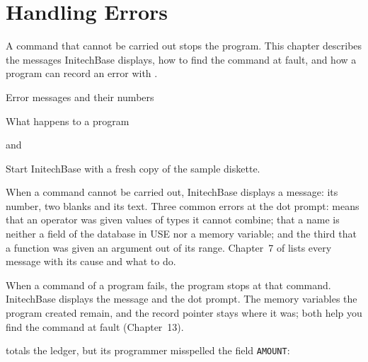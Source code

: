 \chapter{Handling Errors}
A command that cannot be carried out stops the program.  This chapter
describes the messages InitechBase displays, how to find the command at fault,
and how a program can record an error with .

\begin{ChapterCovers}
\item Error messages and their numbers
\item What happens to a program
\item {} and 
\end{ChapterCovers}

Start InitechBase with a fresh copy of the sample diskette.

When a command cannot be carried out, InitechBase displays a message: its
number, two blanks and its text.  Three common errors at the dot prompt:
 means that an operator was given values of types
it cannot combine;  that a name is neither a field
of the database in USE nor a memory variable; and the third that a function was
given an argument out of its range.  Chapter~7 of 
lists every message with its cause and what to do.

When a command of a program fails, the program stops at that command.
InitechBase displays the message and the dot prompt.  The memory variables the
program created remain, and the record pointer stays where it was; both help
you find the command at fault (Chapter~13).

 totals the ledger, but its programmer misspelled the field
\texttt{AMOUNT}:

